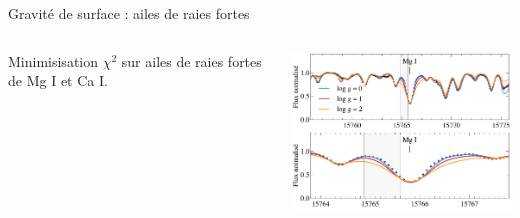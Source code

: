 \documentclass[10pt]{beamer}
\begin{document}
\begin{frame}[fragile]{Gravité de surface : ailes de raies fortes}
   \begin{columns}
       \begin{column}{0.3\textwidth}
        Minimisisation $\chi^2$ sur ailes de raies fortes de Mg I et Ca I.
       \end{column}
       \begin{column}{0.7\textwidth}
           \begin{center}
            \includegraphics[width=8cm]{../output/test4.pdf}  
           \end{center}
       \end{column}
       \end{columns}
\end{frame}
\end{document}
